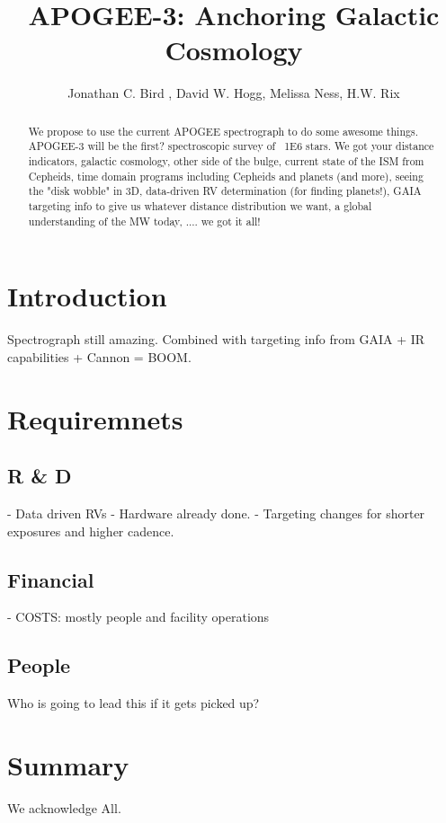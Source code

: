 \documentclass[11pt,preprint]{aastex}
\begin{document}
\title{APOGEE-3: Anchoring Galactic Cosmology}

\author{Jonathan C. Bird , David W. Hogg, Melissa Ness, H.W. Rix}


\begin{abstract}
We propose to use the current APOGEE spectrograph to do some awesome things. APOGEE-3 will be the first? spectroscopic survey of ~1E6 stars. We got your distance indicators, galactic cosmology, other side of the bulge, current state of the ISM from Cepheids, time domain programs including Cepheids and planets (and more), seeing the "disk wobble" in 3D, data-driven RV determination (for finding planets!), GAIA targeting info to give us whatever distance distribution we want, a global understanding of the MW today, .... we got it all!
\end{abstract}

\section{Introduction}
\label{sec:intro}
Spectrograph still amazing. Combined with targeting info from GAIA + IR capabilities + Cannon = BOOM. 


\section{Requiremnets}
\label{sec:results}
\subsection{R \& D}
- Data driven RVs
- Hardware already done. 
- Targeting changes for shorter exposures and higher cadence.

\subsection{Financial}
- COSTS: mostly people and facility operations

\subsection{People}
Who is going to lead this if it gets picked up?

\section{Summary}
\label{sec:summary}

\acknowledgements
We acknowledge All.

%
%
%
\end{document}
